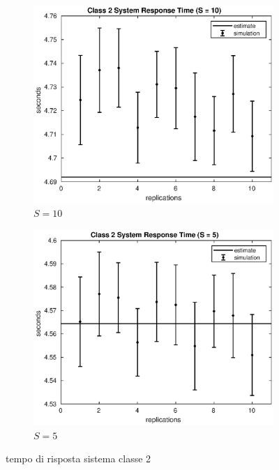 \begin{figure}[!h]
\begin{subfigure}[t]{0.49\textwidth}
\includegraphics[width=\textwidth]{figures/simul/10_500K_s2}
\caption{$S = 10$}
\label{10_s2}
\end{subfigure}
%
\begin{subfigure}[t]{0.49\textwidth}
\includegraphics[width=\textwidth]{figures/simul/5_500K_s2}
\caption{$S = 5$}
\label{5_s2}
\end{subfigure}
%
\caption{tempo di risposta sistema classe 2}
\label{plot:s2}
\end{figure}
%
%

